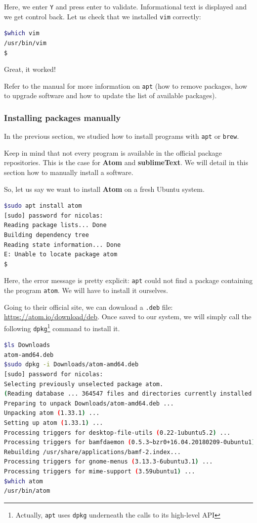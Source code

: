 \documentclass[12pt]{article}
\begin{document}
Here, we enter \texttt{Y} and press enter to validate. Informational text is displayed and we get control back. Let us check that we installed \texttt{vim} correctly:

\begin{lstlisting}[language=bash]
$which vim
/usr/bin/vim
$
\end{lstlisting}

Great, it worked!

Refer to the manual for more information on \texttt{apt} (how to remove packages, how to upgrade software and how to update the list of available packages).

\subsubsection{Installing packages manually}

In the previous section, we studied how to install programs with \texttt{apt} or \texttt{brew}.

Keep in mind that not every program is available in the official package repositories. This is the case for \textbf{Atom} and \textbf{sublimeText}. We will detail in this section how to manually install a software.

So, let us say we want to install \textbf{Atom} on a fresh Ubuntu system.

\begin{lstlisting}[language=bash]
$sudo apt install atom
[sudo] password for nicolas: 
Reading package lists... Done
Building dependency tree       
Reading state information... Done
E: Unable to locate package atom
$
\end{lstlisting}

Here, the error message is pretty explicit: \texttt{apt} could not find a package containing the program \texttt{atom}. We will have to install it ourselves.

Going to their official site, we can download a \texttt{.deb} file: \url{https://atom.io/download/deb}.
Once saved to our system, we will simply call the following \texttt{dpkg}\footnote{Actually, \texttt{apt} uses \texttt{dpkg} underneath the calls to its high-level API} command to install it.

\begin{lstlisting}[language=bash]
$ls Downloads
atom-amd64.deb
$sudo dpkg -i Downloads/atom-amd64.deb
[sudo] password for nicolas: 
Selecting previously unselected package atom.
(Reading database ... 364547 files and directories currently installed.)
Preparing to unpack Downloads/atom-amd64.deb ...
Unpacking atom (1.33.1) ...
Setting up atom (1.33.1) ...
Processing triggers for desktop-file-utils (0.22-1ubuntu5.2) ...
Processing triggers for bamfdaemon (0.5.3~bzr0+16.04.20180209-0ubuntu1) ...
Rebuilding /usr/share/applications/bamf-2.index...
Processing triggers for gnome-menus (3.13.3-6ubuntu3.1) ...
Processing triggers for mime-support (3.59ubuntu1) ...
$which atom
/usr/bin/atom
\end{lstlisting}
\end{document}
